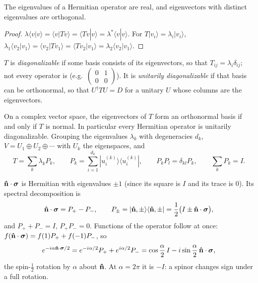 \begin{theorem}
The eigenvalues of a Hermitian operator are real, and eigenvectors with distinct eigenvalues are orthogonal.
\end{theorem}
\begin{proof}
$\lambda\langle v|v\rangle = \langle v|Tv\rangle = \langle Tv|v\rangle = \lambda^*\langle v|v\rangle$. For $T|v_i\rangle = \lambda_i|v_i\rangle$, $\lambda_1\langle v_2|v_1\rangle = \langle v_2|Tv_1\rangle = \langle Tv_2|v_1\rangle = \lambda_2\langle v_2|v_1\rangle$.
\end{proof}

$T$ is \emph{diagonalizable} if some basis consists of its eigenvectors, so that $T_{ij} = \lambda_i\delta_{ij}$; not every operator is (e.g.\ $\begin{pmatrix}0&1\\0&0\end{pmatrix}$). It is \emph{unitarily diagonalizable} if that basis can be orthonormal, so that $U^\dagger TU = D$ for a unitary $U$ whose columns are the eigenvectors.

\begin{theorem}
On a complex vector space, the eigenvectors of $T$ form an orthonormal basis if and only if $T$ is normal. In particular every Hermitian operator is unitarily diagonalizable. Grouping the eigenvalues $\lambda_k$ with degeneracies $d_k$, $V = U_1\oplus U_2\oplus\cdots$ with $U_k$ the eigenspaces, and
\[
    T = \sum_k\lambda_kP_k,
    \qquad
    P_k = \sum_{i=1}^{d_k}|u_i^{(k)}\rangle\langle u_i^{(k)}|,
    \qquad
    P_kP_l = \delta_{kl}P_k,
    \qquad
    \sum_kP_k = I .
\]
\end{theorem}

\begin{example}
$\boldsymbol{\hat{\textbf{n}}}\cdot\bm{\sigma}$ is Hermitian with eigenvalues $\pm1$ (since its square is $I$ and its trace is 0). Its spectral decomposition is
\[
    \boldsymbol{\hat{\textbf{n}}}\cdot\bm{\sigma} = P_+ - P_-,
    \qquad
    P_\pm = |\boldsymbol{\hat{\textbf{n}}},\pm\rangle\langle\boldsymbol{\hat{\textbf{n}}},\pm| = \frac12\bigl(I\pm\boldsymbol{\hat{\textbf{n}}}\cdot\bm{\sigma}\bigr),
\]
and $P_++P_- = I$, $P_+P_- = 0$. Functions of the operator follow at once: $f(\boldsymbol{\hat{\textbf{n}}}\cdot\bm{\sigma}) = f(1)P_+ + f(-1)P_-$, so
\[
    e^{-i\alpha\boldsymbol{\hat{\textbf{n}}}\cdot\bm{\sigma}/2} = e^{-i\alpha/2}P_+ + e^{i\alpha/2}P_- = \cos\frac\alpha2\,I - i\sin\frac\alpha2\,\boldsymbol{\hat{\textbf{n}}}\cdot\bm{\sigma},
\]
the spin-$\frac12$ rotation by $\alpha$ about $\boldsymbol{\hat{\textbf{n}}}$. At $\alpha = 2\pi$ it is $-I$: a spinor changes sign under a full rotation.
\end{example}

